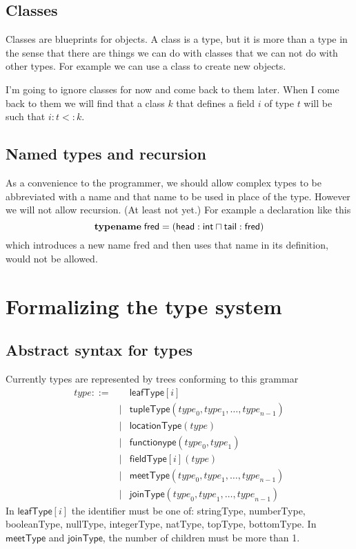 \documentclass[12pt]{article}
\begin{document}
\subsection{Classes}

Classes are blueprints for objects. A class is a type, but it is more than a
type in the sense that there are things we can do with classes that we can
not do with other types. For example we can use a class to create new
objects.

I'm going to ignore classes for now and come back to them later. When I come
back to them we will find that a class $k$ that defines a field $i$ of type $%
t$ will be such that $i\colon t<:k$.

\subsection{Named types and recursion}

As a convenience to the programmer, we should allow complex types to be
abbreviated with a name and that name to be used in place of the type.
However we will not allow recursion. (At least not yet.) For example a
declaration like this%
\begin{equation*}
\mathbf{typename}\;\mathsf{fred}=(\mathsf{head}:\mathsf{int}\sqcap \mathsf{%
tail}:\mathsf{fred)}
\end{equation*}%
which introduces a new name \textsf{fred} and then uses that name in its
definition, would not be allowed.

\section{Formalizing the type system}

\subsection{Abstract syntax for types\label{sec:type-syntax}}

Currently types are represented by trees conforming to this grammar%
\begin{eqnarray*}
\mathit{type} ::=&&\mathsf{leafType}\left[ i\right] \\
&\mid &\mathsf{tupleType}\left( \mathit{type}_{0},\mathit{type}_{1},\ldots ,%
\mathit{type}_{n-1}\right) \\
&\mid &\mathsf{locationType}(\mathit{type}) \\
&\mid &\mathsf{functionype}\left( \mathit{type}_{0},\mathit{type}_{1}\right)
\\
&\mid &\mathsf{fieldType}[i](\mathit{type}) \\
&\mid &\mathsf{meetType}\left( \mathit{type}_{0},\mathit{type}_{1},\ldots ,%
\mathit{type}_{n-1}\right) \\
&\mid &\mathsf{joinType}\left( \mathit{type}_{0},\mathit{type}_{1},\ldots ,%
\mathit{type}_{n-1}\right)
\end{eqnarray*}%
In $\mathsf{leafType}\left[ i\right] $ the identifier must be one of:
stringType, numberType, booleanType, nullType, integerType, natType,
topType, bottomType. In $\mathsf{meetType}$ and $\mathsf{joinType}$, the
number of children must be more than 1.
\end{document}
